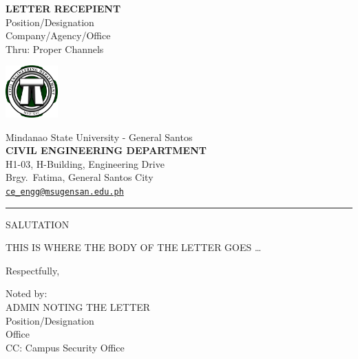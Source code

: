 \documentclass[11pt]{letter}
\date{SPECIFY DATE} %
\begin{document}
\begin{letter}{
		\textbf{LETTER RECEPIENT}\\
		Position/Designation\\
		Company/Agency/Office\\[1em]
		\hspace*{1em} Thru: Proper Channels
	}

	\hspace{0.1cm}
	\includegraphics[width=0.15\textwidth]{logo.png}
	\vspace{-3cm}

	\begin{center}
		Mindanao State University - General Santos\\
		\textbf{CIVIL ENGINEERING DEPARTMENT}\\
		H1-03, H-Building, Engineering Drive\\
		Brgy.\ Fatima, General Santos City\\
		\href{mailto:ce_engg@msugensan.edu.ph}{\nolinkurl{ce_engg@msugensan.edu.ph}}
	\end{center}
	\vspace{1em}
	\hrule
	\vspace{2em}
	\opening{SALUTATION} %

	\pagestyle{empty}

	THIS IS WHERE THE BODY OF THE LETTER GOES \dots

	\vspace*{1em}
	\closing{Respectfully,}
	\vspace*{1em}
	Noted by:\\[3em]
	ADMIN NOTING THE LETTER\\
	Position/Designation\\
	Office\\[6em]
	\small{CC: \hspace{1em} Campus Security Office}
\end{letter}
\end{document}
